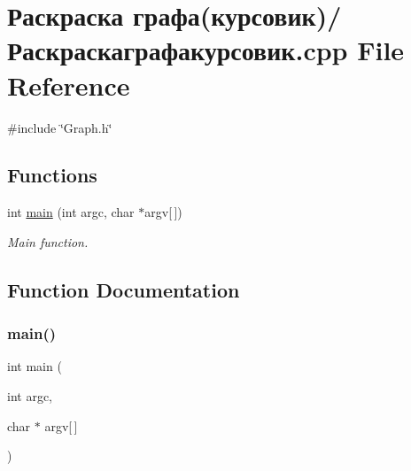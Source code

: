 \hypertarget{_xD0_xA0_xD0_xB0_xD1_x81_xD0_xBA_xD1_x80_xD0_xB0_xD1_x81_xD0_xBA_xD0_xB0_xD0_xB3_xD1_x80_xD0_xB0e8d2baa48db8d36c224eee98dfe2bd71}{}\section{Раскраска графа(курсовик)/Раскраскаграфакурсовик.cpp File Reference}
\label{_xD0_xA0_xD0_xB0_xD1_x81_xD0_xBA_xD1_x80_xD0_xB0_xD1_x81_xD0_xBA_xD0_xB0_xD0_xB3_xD1_x80_xD0_xB0e8d2baa48db8d36c224eee98dfe2bd71}
{\ttfamily \#include \char`\"{}Graph.\+h\char`\"{}}\newline
\subsection*{Functions}
\begin{DoxyCompactItemize}
\item 
int \mbox{\hyperlink{_xD0_xA0_xD0_xB0_xD1_x81_xD0_xBA_xD1_x80_xD0_xB0_xD1_x81_xD0_xBA_xD0_xB0_xD0_xB3_xD1_x80_xD0_xB0e8d2baa48db8d36c224eee98dfe2bd71_a0ddf1224851353fc92bfbff6f499fa97}{main}} (int argc, char $\ast$argv\mbox{[}$\,$\mbox{]})
\begin{DoxyCompactList}\small\item\em Main function. \end{DoxyCompactList}\end{DoxyCompactItemize}


\subsection{Function Documentation}
\mbox{\label{_xD0_xA0_xD0_xB0_xD1_x81_xD0_xBA_xD1_x80_xD0_xB0_xD1_x81_xD0_xBA_xD0_xB0_xD0_xB3_xD1_x80_xD0_xB0e8d2baa48db8d36c224eee98dfe2bd71_a0ddf1224851353fc92bfbff6f499fa97}} 
\subsubsection{\texorpdfstring{main()}{main()}}
{\footnotesize\ttfamily int main (\begin{DoxyParamCaption}\item[{int}]{argc,  }\item[{char $\ast$}]{argv\mbox{[}$\,$\mbox{]} }\end{DoxyParamCaption})}



